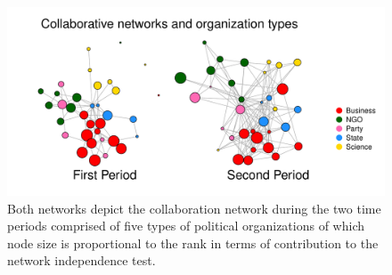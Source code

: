 \documentclass[12pt]{article}
\begin{document}
\begin{figure}[H]
	\centering
	\includegraphics[width=6in]{../Figure/two_politics.pdf}
	\caption{Both networks depict the collaboration network  during the two time periods  comprised of five types of political organizations of which node size is proportional to the rank in terms of contribution to the network independence test.}
	\label{fig:politics}
\end{figure}
\end{document}
